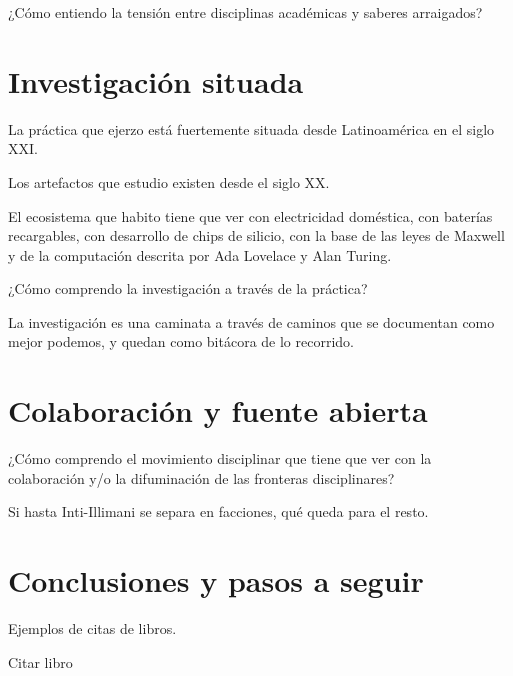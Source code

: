 \documentclass{article}
\begin{document}
¿Cómo entiendo la tensión entre disciplinas académicas y saberes arraigados?

\section{Investigación situada}

La práctica que ejerzo está fuertemente situada desde Latinoamérica en el siglo XXI.

Los artefactos que estudio existen desde el siglo XX.

El ecosistema que habito tiene que ver con electricidad doméstica, con baterías recargables, con desarrollo de chips de silicio, con la base de las leyes de Maxwell y de la computación descrita por Ada Lovelace y Alan Turing.

¿Cómo comprendo la investigación a través de la práctica?

La investigación es una caminata a través de caminos que se documentan como mejor podemos, y quedan como bitácora de lo recorrido.



\section{Colaboración y fuente abierta}

¿Cómo comprendo el movimiento disciplinar que tiene que ver con la colaboración y/o la difuminación de las fronteras disciplinares?

Si hasta Inti-Illimani se separa en facciones, qué queda para el resto.

\section{Conclusiones y pasos a seguir}

Ejemplos de citas de libros.

Citar libro \cite{korgBerlin}


\printbibliography[title={Bibliografía}, heading=bibintoc]
\end{document}

